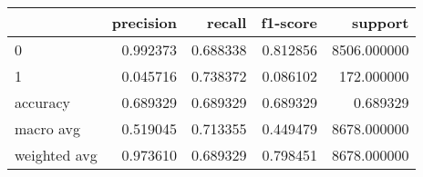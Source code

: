 \begin{tabular}{lrrrr}
\toprule
{} &  precision &    recall &  f1-score &      support \\
\midrule
0            &   0.992373 &  0.688338 &  0.812856 &  8506.000000 \\
1            &   0.045716 &  0.738372 &  0.086102 &   172.000000 \\
accuracy     &   0.689329 &  0.689329 &  0.689329 &     0.689329 \\
macro avg    &   0.519045 &  0.713355 &  0.449479 &  8678.000000 \\
weighted avg &   0.973610 &  0.689329 &  0.798451 &  8678.000000 \\
\bottomrule
\end{tabular}
